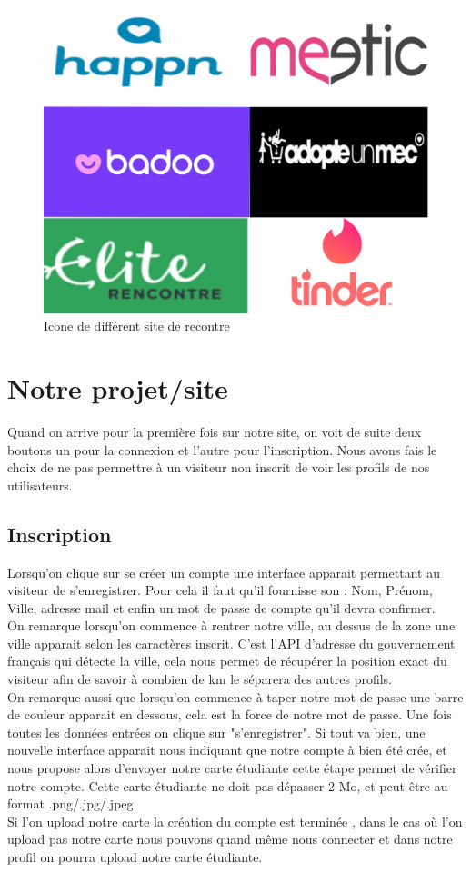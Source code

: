 \documentclass[12pt]{report}
\begin{document}
\begin{figure}[h!]
	\begin{center}
		\includegraphics[scale=0.3]{intro.jpg}
	\end{center}
		\caption{Icone de différent site de recontre}
\end{figure}
\clearpage

\section{Notre projet/site}
	Quand on arrive pour la première fois sur notre site, on voit de suite deux boutons un pour la connexion et l'autre pour l'inscription. Nous avons fais le choix de ne pas permettre à un visiteur non inscrit de voir les profils de nos utilisateurs.
	\subsection{Inscription}
	Lorsqu'on clique sur se créer un compte une interface apparait permettant au visiteur de s'enregistrer. Pour cela il faut qu'il fournisse son : Nom, Prénom, Ville, adresse mail et enfin un mot de passe de compte qu'il devra confirmer.\\
	On remarque lorsqu'on commence à rentrer notre ville, au dessus de la zone une ville apparait selon les caractères inscrit. C'est l'API d'adresse du gouvernement français qui détecte la ville, cela nous permet de récupérer la position exact du visiteur afin de savoir à combien de km le séparera des autres profils.\\
On remarque aussi que lorsqu'on commence à taper notre mot de passe une barre de couleur apparait en dessous, cela est la force de notre mot de passe. Une fois toutes les données entrées on clique sur "s'enregistrer". Si tout va bien, une nouvelle interface apparait nous indiquant que notre compte à bien été crée, et nous propose alors d'envoyer notre carte étudiante cette étape permet de vérifier notre compte. Cette carte étudiante ne doit pas dépasser 2 Mo, et peut être au format .png/.jpg/.jpeg.\\
Si l'on upload notre carte la création du compte est terminée , dans le cas où l'on upload pas notre carte nous pouvons quand même nous connecter et dans notre profil on pourra upload notre carte étudiante.
\end{document}

